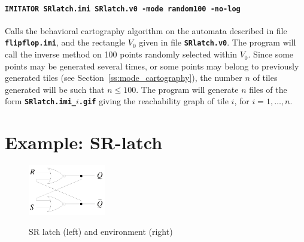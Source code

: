 \documentclass[a4paper,10pt]{article}
\newcommand{\imitatorExec}{\code{IMITATOR}}
\newcommand{\code}[1]{\textbf{\texttt{#1}}}
\begin{document}
\paragraph{\code{\imitatorExec{} SRlatch.imi SRlatch.v0 -mode random100 -no-log}}
Calls the behavioral cartography algorithm on the automata described in file \code{flipflop.imi}, and the rectangle $V_0$ given in file \code{SRlatch.v0}.
The program will call the inverse method on 100 points randomly selected within $V_0$.
Since some points may be generated several times, or some points may belong to previously generated tiles (see Section~\ref{ss:mode_cartography}), the number $n$ of tiles generated will be such that $n \leq 100$.
The program will generate $n$ files of the form \code{SRlatch.imi\_$i$.gif} giving the reachability graph of tile $i$, for $i = 1, \dots, n$.



\section{Example: SR-latch} \label{sec:example}



\begin{figure}
\centering
\includegraphics[width=0.30\textwidth]{include/SRlatch.pdf}
\ \ \ \ \ \ \ \ 

\caption{SR latch (left) and environment (right)}
\label{fig:srlatch}
\end{figure}
\end{document}
